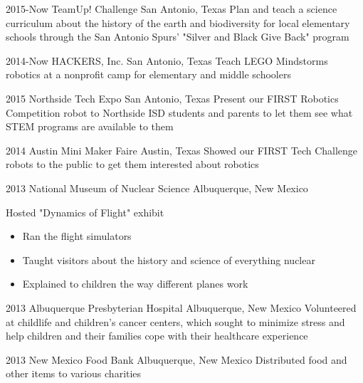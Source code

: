 \documentclass[]{friggeri-cv} %
\begin{document}
\begin{entrylist}

\entry
{2015-Now}
{TeamUp! Challenge}
{San Antonio, Texas}
{Plan and teach a science curriculum about the history of the earth and biodiversity for local elementary schools through the San Antonio Spurs' "Silver and Black Give Back" program}


\entry
{2014-Now}
{HACKERS, Inc.}
{San Antonio, Texas}
{Teach LEGO Mindstorms robotics at a nonprofit camp for elementary and middle schoolers}


\entry
{2015}
{Northside Tech Expo}
{San Antonio, Texas}
{Present our FIRST Robotics Competition robot to Northside ISD students and parents to let them see what STEM programs are available to them}


\entry
{2014}
{Austin Mini Maker Faire}
{Austin, Texas}
{Showed our FIRST Tech Challenge robots to the public to get them interested about robotics}


\entry
{2013}
{National Museum of Nuclear Science}
{Albuquerque, New Mexico}
{Hosted "Dynamics of Flight" exhibit 
\begin{itemize}
\item Ran the flight simulators 
\item Taught visitors about the history and science of everything nuclear 
\item Explained to children the way different planes work 
\end{itemize}
}


\entry
{2013}
{Albuquerque Presbyterian Hospital}
{Albuquerque, New Mexico}
{Volunteered at childlife and children's cancer centers, which sought to minimize stress and help children and their families cope with their healthcare experience}

\entry
{2013}
{New Mexico Food Bank}
{Albuquerque, New Mexico}
{Distributed food and other items to various charities}



\end{entrylist}
\end{document}
